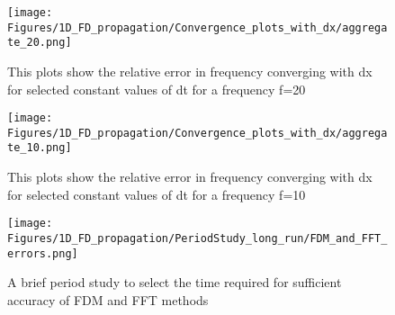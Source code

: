 \begin{figure}
\texttt{[image: Figures/1D\_FD\_propagation/Convergence\_plots\_with\_dx/aggregate\_20.png]}
\caption{This plots show the relative error in frequency converging with dx for selected constant values of dt for a frequency f=20}
\end{figure}

\begin{figure}
\texttt{[image: Figures/1D\_FD\_propagation/Convergence\_plots\_with\_dx/aggregate\_10.png]}
\caption{This plots show the relative error in frequency converging with dx for selected constant values of dt for a frequency f=10}
\end{figure}

\begin{figure}
\texttt{[image: Figures/1D\_FD\_propagation/PeriodStudy\_long\_run/FDM\_and\_FFT\_errors.png]}
\caption{A brief period study to select the time required for sufficient accuracy of FDM and FFT methods}
\end{figure}
